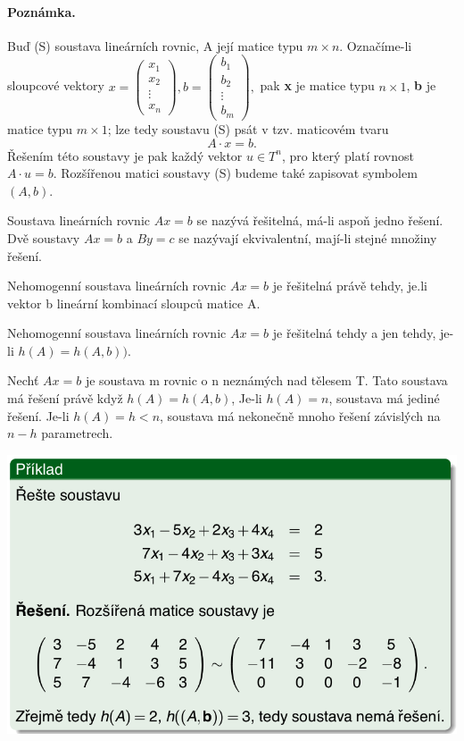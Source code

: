 \paragraph{Poznámka.} Buď (S) soustava lineárních rovnic, A její matice typu $m \times n$. Označíme-li sloupcové vektory $x = \left( \begin{array}{c}
							x_1\\
							x_2\\
							\vdots \\
							x_n
						\end{array} \right),
						b = \left( \begin{array}{c}
							b_1\\
							b_2\\
							\vdots \\
							b_m
						\end{array} \right),$
	pak \textbf{x} je matice typu $n \times 1$, \textbf{b} je matice typu $m \times 1$; lze tedy soustavu (S) psát v tzv. maticovém tvaru $$A \cdot x = b.$$ Řešením této soustavy je pak každý vektor $u \in T^n$, pro který platí rovnost $A \cdot u = b$. Rozšířenou matici soustavy (S) budeme také zapisovat symbolem $(A, b)$.
	
\begin{definition}
	Soustava lineárních rovnic $Ax = b$ se nazývá řešitelná, má-li aspoň jedno řešení. Dvě soustavy $Ax = b$ a $By = c$ se nazývají ekvivalentní, mají-li stejné množiny řešení.
\end{definition}

\begin{definition}
	Nehomogenní soustava lineárních rovnic $Ax = b$ je řešitelná právě tehdy, je.li vektor b lineární kombinací sloupců matice A.
\end{definition}
\begin{sentence}
	Nehomogenní soustava lineárních rovnic $Ax = b$ je řešitelná tehdy a jen tehdy, je-li $h(A) = h(A, b))$.
\end{sentence}
\begin{definition}
	Nechť $Ax = b$ je soustava m rovnic o n neznámých nad tělesem T. Tato soustava má řešení právě když $h(A) = h(A,b)$, Je-li $h(A) = n$, soustava má jediné řešení. Je-li $h(A) = h < n$, soustava má nekonečně mnoho řešení závislých na $n - h$ parametrech.
\end{definition}
\includegraphics[scale=0.5]{img/LinSoust1}

